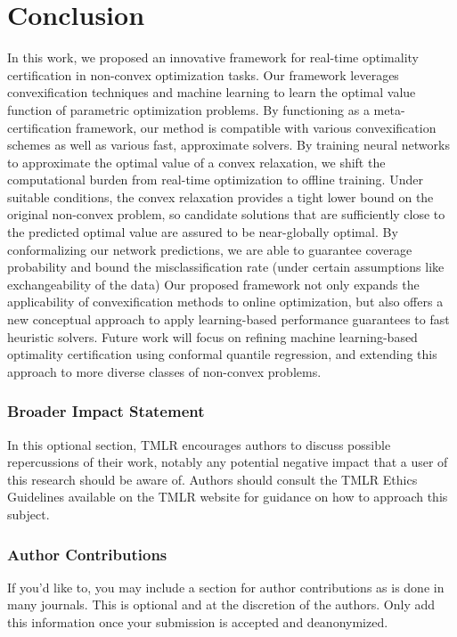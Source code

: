 \documentclass[10pt]{article} %
\theoremstyle{plain}
\theoremstyle{definition}
\theoremstyle{remark}
\begin{document}
\section{Conclusion} \label{sec:conclusion}
In this work, we proposed an innovative framework for real-time optimality certification in non-convex optimization tasks.
Our framework leverages convexification techniques and machine learning to learn the optimal value function of parametric optimization problems.
By functioning as a meta-certification framework, our method is compatible with various convexification schemes as well as various fast, approximate solvers. 
By training neural networks to approximate the optimal value of a convex relaxation, we shift the computational burden from real-time optimization to offline training. 
Under suitable conditions, the convex relaxation provides a tight lower bound on the original non-convex problem, so candidate solutions that are sufficiently close to the predicted optimal value are assured to be near-globally optimal.
By conformalizing our network predictions, we are able to guarantee coverage probability and bound the misclassification rate (under certain assumptions like exchangeability of the data)
Our proposed framework not only expands the applicability of convexification methods to online optimization, but also offers a new conceptual approach to apply learning-based performance guarantees to fast heuristic solvers.
Future work will focus on refining machine learning-based optimality certification using conformal quantile regression, and extending this approach to more diverse classes of non-convex problems.


\subsubsection*{Broader Impact Statement}
In this optional section, TMLR encourages authors to discuss possible repercussions of their work,
notably any potential negative impact that a user of this research should be aware of. 
Authors should consult the TMLR Ethics Guidelines available on the TMLR website
for guidance on how to approach this subject.

\subsubsection*{Author Contributions}
If you'd like to, you may include a section for author contributions as is done
in many journals. This is optional and at the discretion of the authors. Only add
this information once your submission is accepted and deanonymized. 
\end{document}
